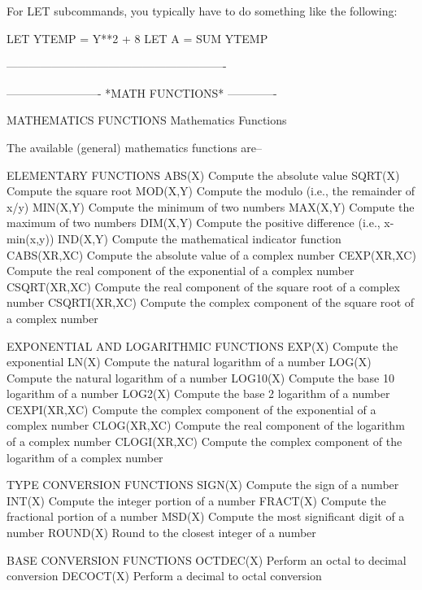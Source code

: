       For LET subcommands, you typically have to do something like the
      following:
 
         LET YTEMP = Y**2 + 8
         LET A = SUM YTEMP
 
----------------------------------------------------------
 
 
 
 
-------------------------  *MATH FUNCTIONS*  -------------
 
MATHEMATICS FUNCTIONS
Mathematics Functions
 
The available (general) mathematics functions are--
 
ELEMENTARY FUNCTIONS
   ABS(X)         Compute the absolute value
   SQRT(X)        Compute the square root
   MOD(X,Y)       Compute the modulo (i.e., the remainder of x/y)
   MIN(X,Y)       Compute the minimum of two numbers
   MAX(X,Y)       Compute the maximum of two numbers
   DIM(X,Y)       Compute the positive difference (i.e., x-min(x,y))
   IND(X,Y)       Compute the mathematical indicator function
   CABS(XR,XC)    Compute the absolute value of a complex number
   CEXP(XR,XC)    Compute the real component of the exponential of a
                  complex number
   CSQRT(XR,XC)   Compute the real component of the square root of a
                  complex number
   CSQRTI(XR,XC)  Compute the complex component of the square root of a
                  complex number
 
EXPONENTIAL AND LOGARITHMIC FUNCTIONS
   EXP(X)         Compute the exponential
   LN(X)          Compute the natural logarithm of a number
   LOG(X)         Compute the natural logarithm of a number
   LOG10(X)       Compute the base 10 logarithm of a number
   LOG2(X)        Compute the base 2 logarithm of a number
   CEXPI(XR,XC)   Compute the complex component of the exponential of a
                  complex number
   CLOG(XR,XC)    Compute the real component of the logarithm of a
                  complex number
   CLOGI(XR,XC)   Compute the complex component of the logarithm of a
                  complex number
 
TYPE CONVERSION FUNCTIONS
   SIGN(X)        Compute the sign of a number
   INT(X)         Compute the integer portion of a number
   FRACT(X)       Compute the fractional portion of a number
   MSD(X)         Compute the most significant digit of a number
   ROUND(X)       Round to the closest integer of a number
 
BASE CONVERSION FUNCTIONS
   OCTDEC(X)      Perform an octal to decimal conversion
   DECOCT(X)      Perform a decimal to octal conversion
 
